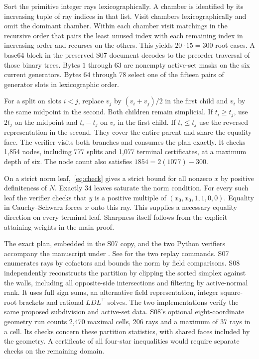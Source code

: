 Sort the primitive integer rays lexicographically. A chamber is
identified by its increasing tuple of ray indices in that list.
Visit chambers lexicographically and omit the dominant chamber.
Within each chamber visit matchings in the recursive order that
pairs the least unused index with each remaining index in increasing
order and recurses on the others. This yields $20\cdot15=300$
root cases. A base64 block in the preserved S07 document decodes
to the preorder traversal of those binary trees.
Bytes $1$ through $63$ are nonempty active-set masks on the six
current generators. Bytes $64$ through $78$ select one of the
fifteen pairs of generator slots in lexicographic order.

For a split on slots $i<j$, replace $v_j$ by $(v_i+v_j)/2$ in
the first child and $v_i$ by the same midpoint in the second.
Both children remain simplicial. If $t_i\ge t_j$, use $2t_j$
on the midpoint and $t_i-t_j$ on $v_i$ in the first child.
If $t_i\le t_j$ use the reversed representation in the second.
They cover the entire parent and share the equality face. The
verifier visits both branches and consumes the plan exactly.
It checks 1,854 nodes, including 777 splits and 1,077 terminal
certificates, at a maximum depth of six. The node count also satisfies $1854=2(1077)-300$.

On a strict norm leaf,~\eqref{eq:check} gives a strict bound for
all nonzero $x$ by positive definiteness of $N$. Exactly 34 leaves
saturate the norm condition. For every such leaf the verifier
checks that $y$ is a positive multiple of $(x_0,x_0,1,1,0,0)$.
Equality in Cauchy--Schwarz forces $x$ onto this ray. This supplies
a necessary equality direction on every terminal leaf. Sharpness
itself follows from the explicit attaining weights in the main
proof.

The exact plan, embedded in the S07 copy, and the two Python
verifiers accompany the manuscript under .
See  for the two replay commands. S07 enumerates
rays by cofactors and bounds the norm by field comparisons. S08
independently reconstructs the partition by clipping the sorted
simplex against the walls, including all opposite-side intersections
and filtering by active-normal rank. It uses full sign sums,
an alternative field representation, integer square-root brackets
and rational $LDL^\top$ solves. The two implementations verify the
same proposed subdivision and active-set data. S08's optional
eight-coordinate geometry run counts 2,470 maximal cells, 206
rays and a maximum of 37 rays in a cell. Its checks concern these
partition statistics, with shared faces included by the geometry.
A certificate of all four-star inequalities would require separate
checks on the remaining domain.
